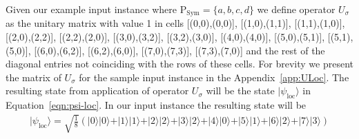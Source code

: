 \begin{example}
Given our example input instance where $\text{P}_{\mathrm{Sym}}=\{a,b,c,d\}$ we define operator $U_{\sigma}$ as the unitary matrix with value 1 in cells [(0,0),(0,0)], [(1,0),(1,1)], [(1,1),(1,0)], [(2,0),(2,2)], [(2,2),(2,0)], [(3,0),(3,2)], [(3,2),(3,0)], [(4,0),(4,0)], [(5,0),(5,1)], [(5,1),(5,0)], [(6,0),(6,2)], [(6,2),(6,0)], [(7,0),(7,3)], [(7,3),(7,0)] and the rest of the diagonal entries not coinciding with the rows of these cells. For brevity we present the matrix of $U_{\sigma}$ for the sample input instance in the Appendix~\ref{app:ULoc}. %
The resulting state from application of operator $U_{\sigma}$ will be the state $\vert \psi_{\mathrm{loc}} \rangle$ in Equation~\ref{eqn:psi-loc}. In our input instance the resulting state will be
\begin{align}
	\vert \psi_{\mathrm{loc}} \rangle = \sqrt{\frac{1}{8}}\left( \vert 0 \rangle\vert 0 \rangle + \vert 1 \rangle\vert 1 \rangle + \vert 2 \rangle\vert 2 \rangle + \vert 3 \rangle\vert 2 \rangle + \vert 4 \rangle\vert 0 \rangle + \vert 5 \rangle\vert 1 \rangle + \vert 6 \rangle\vert 2 \rangle + \vert 7 \rangle\vert 3 \rangle\right)
\end{align}
\end{example}

